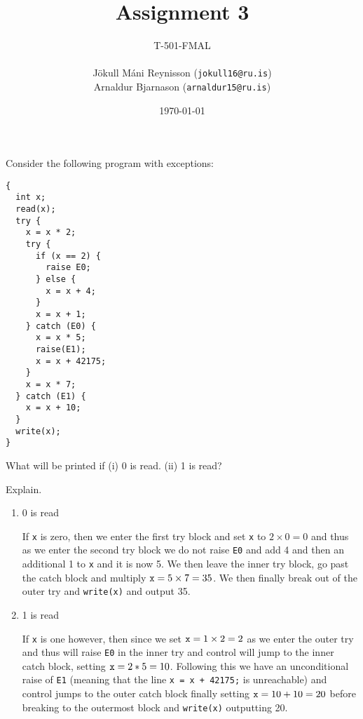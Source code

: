 \documentclass[11pt]{exam}
\begin{document}
\title{Assignment 3}
    \author{{\small T-501-FMAL} \\ \quad \\ Jökull Máni Reynisson ({\tt jokull16@ru.is}) \\  Arnaldur Bjarnason ({\tt arnaldur15@ru.is})}
\date{\today}
\maketitle

\begin{questions}


\question Consider the following program with exceptions:
  \begin{lstlisting}
{
  int x;
  read(x);
  try {
    x = x * 2;
    try {
      if (x == 2) {
        raise E0;
      } else {
        x = x + 4;
      }
      x = x + 1;
    } catch (E0) {
      x = x * 5;
      raise(E1);
      x = x + 42175;
    }
    x = x * 7;
  } catch (E1) {
    x = x + 10;
  }
  write(x);
}
  \end{lstlisting}
What will be printed if (i) 0 is read. (ii) 1 is read?

Explain.
\newpage
        \begin{enumerate}[label=(\roman*)]
            \item 0 is read
                \begin{framed}
                    If {\tt x} is zero, then we enter the first try block and set {\tt x} to $2\times 0 = 0$ and thus as we enter the second try block we do not raise {\tt E0} and add 4 and then an additional 1 to {\tt x} and it is now 5. We then leave the inner try block, go past the catch block and multiply ${\tt x} = 5 \times 7 = 35$.
                    We then finally break out of the outer try and {\tt write(x)} and output 35.
                \end{framed}

            \item 1 is read
                \begin{framed}
                    If {\tt x} is one however, then since we set ${\tt x} = 1 \times 2 = 2$ as we enter the outer try and thus will raise {\tt E0} in the inner try and control will jump to the inner catch block, setting ${\tt x} = 2 * 5 = 10$. Following this we have an unconditional raise of {\tt E1} (meaning that the line {\tt x = x + 42175;} is unreachable) and control jumps to the outer catch block finally setting ${\tt x} = 10 + 10 = 20$ before breaking to the outermost block and {\tt write(x)} outputting 20.
                \end{framed}
        \end{enumerate}




\end{questions}
\end{document}
